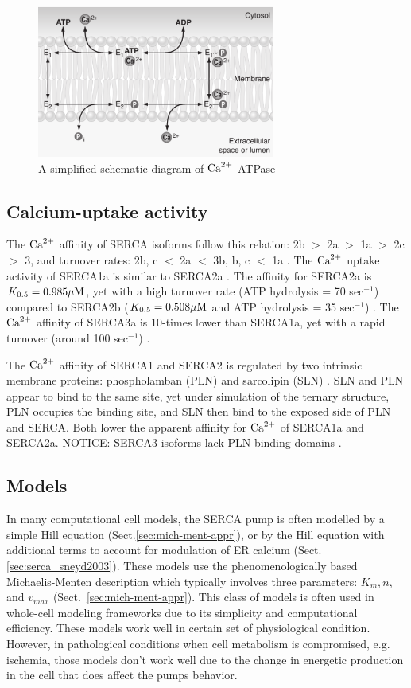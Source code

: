 \begin{figure}[hbt]
  \centerline{\includegraphics[height=5cm,
    angle=0]{./images/brini_CaATPase.eps}}
\caption{A simplified schematic diagram of ${\text{Ca}^{2+}}$-ATPase}
\label{fig:brini_CaATPase}
\end{figure}

\subsection{Calcium-uptake activity}
\label{sec:SERCA_Ca-affinity}

The ${\text{Ca}^{2+}}$ affinity of SERCA isoforms follow this relation: 2b $>$ 2a $>$ 1a $>$
2c $>$ 3, and turnover rates: 2b, c $<$ 2a $<$ 3b, b, c $<$ 1a
\citep{Lipskaia2013}. The ${\text{Ca}^{2+}}$ uptake activity of SERCA1a is similar to SERCA2a
\citep{dode2003}. The affinity for SERCA2a is $K_{0.5}=0.985 {\mu\text{M}}$, yet with a
high turnover rate (ATP hydrolysis = 70 sec$^{-1}$) compared to SERCA2b
($K_{0.5}=0.508 {\mu\text{M}}$ and ATP hydrolysis = 35 sec$^{-1}$) \citep{Dally2010}. The
${\text{Ca}^{2+}}$ affinity of SERCA3a is 10-times lower than SERCA1a, yet with a rapid
turnover (around 100 sec$^{-1}$) \citep{dode2002}.

The ${\text{Ca}^{2+}}$ affinity of SERCA1 and SERCA2 is regulated by two intrinsic membrane
proteins: phospholamban (PLN) and sarcolipin (SLN) \citep{MacLennan2003,
MacLennan2003rsp}. SLN and PLN appear to bind to the same site, yet under
simulation of the ternary structure, PLN occupies the binding site, and SLN then
bind to the exposed side of PLN and SERCA. Both lower the apparent affinity for
${\text{Ca}^{2+}}$ of SERCA1a and SERCA2a. NOTICE: SERCA3 isoforms lack PLN-binding domains
\citep{tada1996}.


\subsection{Models }
\label{sec:SERCA_models}

In many computational cell models, the SERCA pump is often modelled by a simple
Hill equation (Sect.\ref{sec:mich-ment-appr}), or by the Hill equation with
additional terms to account for modulation of ER calcium \citep{favre1996,
sneyd2003} (Sect.\ref{sec:serca_sneyd2003}). These models use the
phenomenologically based Michaelis-Menten description which typically involves
three parameters: $K_m, n$, and $v_{max}$ (Sect.~\ref{sec:mich-ment-appr}). This
class of models is often used in whole-cell modeling frameworks due to its
simplicity and computational efficiency.  These models work well in certain set
of physiological condition.
However, in pathological conditions when cell metabolism is compromised, e.g.
ischemia, those models don't work well due to the change in energetic production
in the cell that does affect the pumps behavior.

